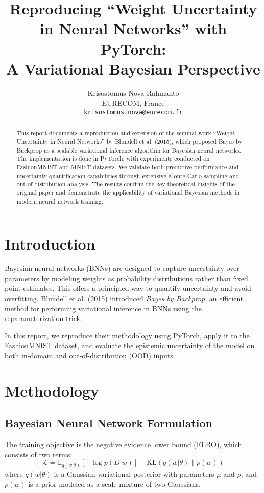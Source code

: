 \documentclass{article}
\title{Reproducing ``Weight Uncertainty in Neural Networks'' with PyTorch: \\ A Variational Bayesian Perspective}
\author{
  Krisostomus Nova Rahmanto \\
  EURECOM, France \\
  \texttt{krisostomus.nova@eurecom.fr} \\
}
\begin{document}
\maketitle

\begin{abstract}
This report documents a reproduction and extension of the seminal work ``Weight Uncertainty in Neural Networks'' by Blundell et al. (2015), which proposed Bayes by Backprop as a scalable variational inference algorithm for Bayesian neural networks. The implementation is done in PyTorch, with experiments conducted on FashionMNIST and MNIST datasets. We validate both predictive performance and uncertainty quantification capabilities through extensive Monte Carlo sampling and out-of-distribution analysis. The results confirm the key theoretical insights of the original paper and demonstrate the applicability of variational Bayesian methods in modern neural network training.
\end{abstract}

\section{Introduction}

Bayesian neural networks (BNNs) are designed to capture uncertainty over parameters by modeling weights as probability distributions rather than fixed point estimates. This offers a principled way to quantify uncertainty and avoid overfitting. Blundell et al. (2015) introduced \textit{Bayes by Backprop}, an efficient method for performing variational inference in BNNs using the reparameterization trick.

In this report, we reproduce their methodology using PyTorch, apply it to the FashionMNIST dataset, and evaluate the epistemic uncertainty of the model on both in-domain and out-of-distribution (OOD) inputs.

\section{Methodology}

\subsection{Bayesian Neural Network Formulation}

The training objective is the negative evidence lower bound (ELBO), which consists of two terms:
\[
\mathcal{L} = \mathbb{E}_{q(w|\theta)} [-\log p(D|w)] + \mathrm{KL}(q(w|\theta) \| p(w))
\]
where $q(w|\theta)$ is a Gaussian variational posterior with parameters $\mu$ and $\rho$, and $p(w)$ is a prior modeled as a scale mixture of two Gaussians.
\end{document}
